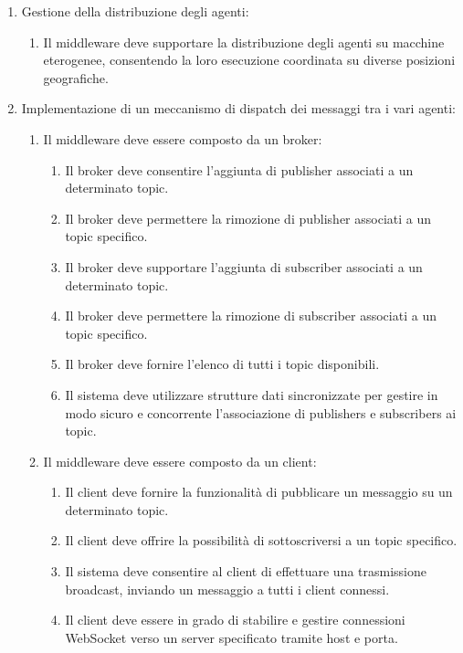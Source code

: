 \begin{enumerate}
      \item Gestione della distribuzione degli agenti:
            \begin{enumerate}
                  \item  Il middleware deve supportare la distribuzione degli agenti su macchine eterogenee,
                        consentendo la loro esecuzione coordinata su diverse posizioni geografiche.
            \end{enumerate}

      \item Implementazione di un meccanismo di dispatch dei messaggi tra i vari agenti:
            \begin{enumerate}
                  \item Il middleware deve essere composto da un broker:
                        \begin{enumerate}
                              \item Il broker deve consentire l'aggiunta di publisher associati a un determinato topic.
                              \item Il broker deve permettere la rimozione di publisher associati a un topic specifico.
                              \item Il broker deve supportare l'aggiunta di subscriber associati a un determinato topic.
                              \item Il broker deve permettere la rimozione di subscriber associati a un topic specifico.
                              \item Il broker deve fornire l'elenco di tutti i topic disponibili.
                              \item Il sistema deve utilizzare strutture dati sincronizzate per gestire in modo sicuro e concorrente l'associazione di publishers e subscribers ai topic.
                        \end{enumerate}
                  \item Il middleware deve essere composto da un client:
                        \begin{enumerate}
                              \item Il client deve fornire la funzionalità di pubblicare un messaggio su un determinato topic.
                              \item Il client deve offrire la possibilità di sottoscriversi a un topic specifico.
                              \item Il sistema deve consentire al client di effettuare una trasmissione broadcast, inviando un messaggio a tutti i client connessi.
                              \item  Il client deve essere in grado di stabilire e gestire connessioni WebSocket verso un server specificato tramite host e porta.
                        \end{enumerate}
            \end{enumerate}


\end{enumerate}
